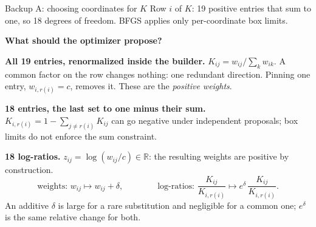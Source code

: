 \documentclass[aspectratio=169,11pt]{beamer}
\begin{document}
\appendix
{}
\begin{frame}[noframenumbering]{Backup A: choosing coordinates for $K$}
\small
Row $i$ of $K$: 19 positive entries that sum to one, so 18 degrees of freedom. BFGS applies only per-coordinate box limits.

\textbf{What should the optimizer propose?}

\textbf{All 19 entries, renormalized inside the builder.}\quad
$K_{ij}=w_{ij}/\sum_k w_{ik}$. A common factor on the row changes nothing: one redundant direction.
Pinning one entry, $w_{i,r(i)}=c$, removes it. These are the \emph{positive weights}.

\textbf{18 entries, the last set to one minus their sum.}\quad
$K_{i,r(i)}=1-\sum_{j\ne r(i)}K_{ij}$ can go negative under independent proposals; box limits do not enforce the sum constraint.

\textbf{18 log-ratios.}\quad
$z_{ij}=\log(w_{ij}/c)\in\mathbb R$: the resulting weights are positive by construction.
\[
 \text{weights: } w_{ij}\mapsto w_{ij}+\delta,
 \qquad\qquad
 \text{log-ratios: } \frac{K_{ij}}{K_{i,r(i)}}\mapsto e^{\delta}\,\frac{K_{ij}}{K_{i,r(i)}} .
\]
An additive $\delta$ is large for a rare substitution and negligible for a common one; $e^{\delta}$ is the same relative change for both.


\vfill

\end{frame}
\end{document}
